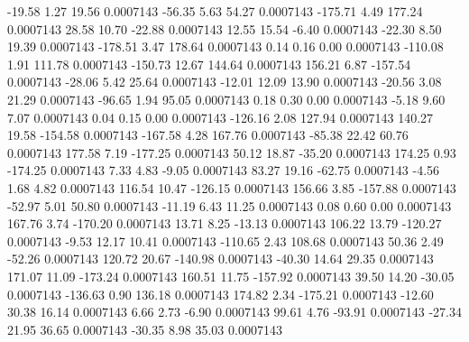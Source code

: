       -19.58        1.27       19.56     0.0007143
      -56.35        5.63       54.27     0.0007143
     -175.71        4.49      177.24     0.0007143
       28.58       10.70      -22.88     0.0007143
       12.55       15.54       -6.40     0.0007143
      -22.30        8.50       19.39     0.0007143
     -178.51        3.47      178.64     0.0007143
        0.14        0.16        0.00     0.0007143
     -110.08        1.91      111.78     0.0007143
     -150.73       12.67      144.64     0.0007143
      156.21        6.87     -157.54     0.0007143
      -28.06        5.42       25.64     0.0007143
      -12.01       12.09       13.90     0.0007143
      -20.56        3.08       21.29     0.0007143
      -96.65        1.94       95.05     0.0007143
        0.18        0.30        0.00     0.0007143
       -5.18        9.60        7.07     0.0007143
        0.04        0.15        0.00     0.0007143
     -126.16        2.08      127.94     0.0007143
      140.27       19.58     -154.58     0.0007143
     -167.58        4.28      167.76     0.0007143
      -85.38       22.42       60.76     0.0007143
      177.58        7.19     -177.25     0.0007143
       50.12       18.87      -35.20     0.0007143
      174.25        0.93     -174.25     0.0007143
        7.33        4.83       -9.05     0.0007143
       83.27       19.16      -62.75     0.0007143
       -4.56        1.68        4.82     0.0007143
      116.54       10.47     -126.15     0.0007143
      156.66        3.85     -157.88     0.0007143
      -52.97        5.01       50.80     0.0007143
      -11.19        6.43       11.25     0.0007143
        0.08        0.60        0.00     0.0007143
      167.76        3.74     -170.20     0.0007143
       13.71        8.25      -13.13     0.0007143
      106.22       13.79     -120.27     0.0007143
       -9.53       12.17       10.41     0.0007143
     -110.65        2.43      108.68     0.0007143
       50.36        2.49      -52.26     0.0007143
      120.72       20.67     -140.98     0.0007143
      -40.30       14.64       29.35     0.0007143
      171.07       11.09     -173.24     0.0007143
      160.51       11.75     -157.92     0.0007143
       39.50       14.20      -30.05     0.0007143
     -136.63        0.90      136.18     0.0007143
      174.82        2.34     -175.21     0.0007143
      -12.60       30.38       16.14     0.0007143
        6.66        2.73       -6.90     0.0007143
       99.61        4.76      -93.91     0.0007143
      -27.34       21.95       36.65     0.0007143
      -30.35        8.98       35.03     0.0007143
